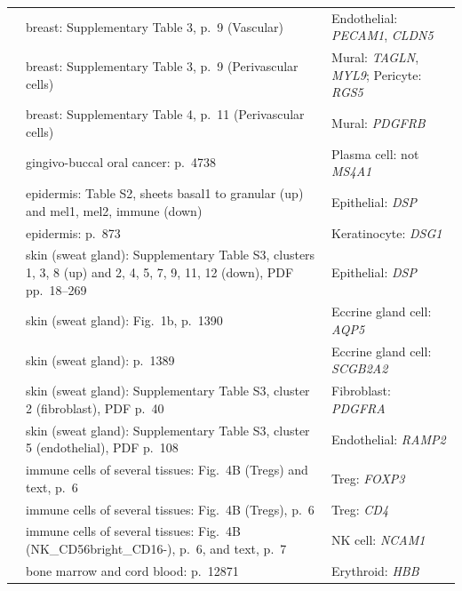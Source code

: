\begin{longtable}{@{}>{\raggedright\arraybackslash}p{2.0cm} >{\raggedright\arraybackslash}p{4.6cm} >{\raggedright\arraybackslash}p{8.4cm}@{}}
\cite{kumarSpatiallyResolvedSinglecell2023} & breast: Supplementary Table 3, p.~9 (Vascular) & Endothelial: \textit{PECAM1}, \textit{CLDN5} \\
\cite{kumarSpatiallyResolvedSinglecell2023} & breast: Supplementary Table 3, p.~9 (Perivascular cells) & Mural: \textit{TAGLN}, \textit{MYL9}; Pericyte: \textit{RGS5} \\
\cite{kumarSpatiallyResolvedSinglecell2023} & breast: Supplementary Table 4, p.~11 (Perivascular cells) & Mural: \textit{PDGFRB} \\
\cite{kurkalangSinglecellTranscriptomicAnalysis2023} & gingivo-buccal oral cancer: p.~4738 & Plasma cell: not \textit{MS4A1} \\
\cite{chengTranscriptionalProgrammingNormal2018} & epidermis: Table S2, sheets basal1 to granular (up) and mel1, mel2, immune (down) & Epithelial: \textit{DSP} \\
\cite{chengTranscriptionalProgrammingNormal2018} & epidermis: p.~873 & Keratinocyte: \textit{DSG1} \\
\cite{tieMolecularCharacterizationAged2024} & skin (sweat gland): Supplementary Table S3, clusters 1, 3, 8 (up) and 2, 4, 5, 7, 9, 11, 12 (down), PDF pp.~18--269 & Epithelial: \textit{DSP} \\
\cite{tieMolecularCharacterizationAged2024} & skin (sweat gland): Fig.~1b, p.~1390 & Eccrine gland cell: \textit{AQP5} \\
\cite{tieMolecularCharacterizationAged2024} & skin (sweat gland): p.~1389 & Eccrine gland cell: \textit{SCGB2A2} \\
\cite{tieMolecularCharacterizationAged2024} & skin (sweat gland): Supplementary Table S3, cluster 2 (fibroblast), PDF p.~40 & Fibroblast: \textit{PDGFRA} \\
\cite{tieMolecularCharacterizationAged2024} & skin (sweat gland): Supplementary Table S3, cluster 5 (endothelial), PDF p.~108 & Endothelial: \textit{RAMP2} \\
\cite{dominguezcondeCrosstissueImmuneCell2022} & immune cells of several tissues: Fig.~4B (Tregs) and text, p.~6 & Treg: \textit{FOXP3} \\
\cite{dominguezcondeCrosstissueImmuneCell2022} & immune cells of several tissues: Fig.~4B (Tregs), p.~6 & Treg: \textit{CD4} \\
\cite{dominguezcondeCrosstissueImmuneCell2022} & immune cells of several tissues: Fig.~4B (NK\_CD56bright\_CD16-), p.~6, and text, p.~7 & NK cell: \textit{NCAM1} \\
\cite{huangPutativeRegulatorsContinuum2020} & bone marrow and cord blood: p.~12871 & Erythroid: \textit{HBB} \\

\end{longtable}
